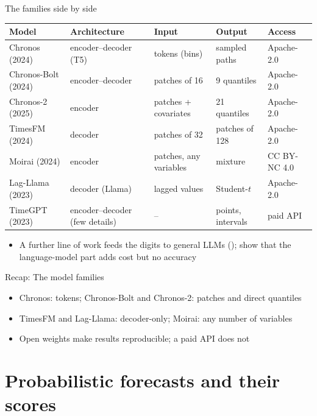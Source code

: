 \begin{frame}{The families side by side}
\itemsize{\footnotesize}
\begin{center}
\scriptsize
\begin{tabular}{lllll}
\toprule
\textbf{Model} & \textbf{Architecture} & \textbf{Input} & \textbf{Output} & \textbf{Access} \\
\midrule
Chronos (2024) & encoder--decoder (T5) & tokens (bins) & sampled paths & Apache-2.0 \\
Chronos-Bolt (2024) & encoder--decoder & patches of 16 & 9 quantiles & Apache-2.0 \\
Chronos-2 (2025) & encoder & patches + covariates & 21 quantiles & Apache-2.0 \\
TimesFM (2024) & decoder & patches of 32 & patches of 128 & Apache-2.0 \\
Moirai (2024) & encoder & patches, any variables & mixture & CC BY-NC 4.0 \\
Lag-Llama (2023) & decoder (Llama) & lagged values & Student-$t$ & Apache-2.0 \\
TimeGPT (2023) & encoder--decoder (few details) & -- & points, intervals & paid API \\
\bottomrule
\end{tabular}
\end{center}
\begin{itemize}
    \item A further line of work feeds the digits to general LLMs ();  show that the language-model part adds cost but no accuracy
\end{itemize}
\end{frame}

\begin{frame}{Recap: The model families}
\itemsize{\small}
\begin{itemize}
    \item Chronos: tokens; Chronos-Bolt and Chronos-2: patches and direct quantiles
    \item TimesFM and Lag-Llama: decoder-only; Moirai: any number of variables
    \item Open weights make results reproducible; a paid API does not
\end{itemize}
\end{frame}


\section{Probabilistic forecasts and their scores}

